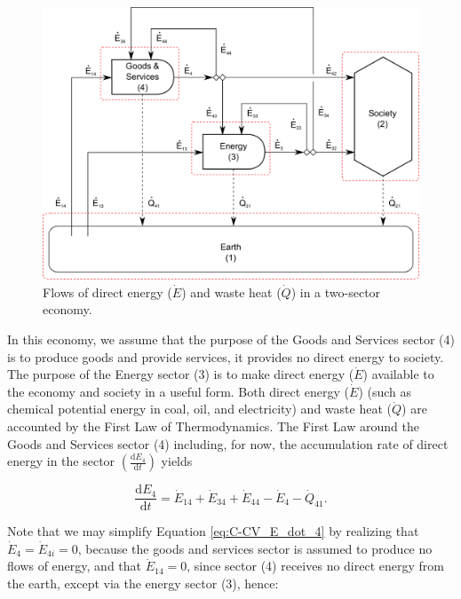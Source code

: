 \documentclass[authoryear,preprint,review,12pt]{elsarticle}
\begin{document}
\begin{figure}[h!]
\includegraphics[width=1.0\linewidth]{images/I-O_three_sector_direct_energy.pdf}
\caption{Flows of direct energy ($\dot{E}$) and waste heat ($\dot{Q}$) in a two-sector economy.}
\label{fig:direct_energy_flows_2}
\end{figure}

In this economy, we assume that the purpose of the Goods and Services sector (4) is to produce goods and provide services, it provides no direct energy to society. The purpose of the Energy sector (3) is to make direct energy ($\dot{E}$) available to the economy and society in a useful form. Both direct energy ($\dot{E}$) (such as chemical potential energy in coal, oil, and electricity) and waste heat ($\dot{Q}$) are accounted by the First Law of Thermodynamics. The First Law around the Goods and Services sector (4) including, for now, the accumulation rate of direct energy in the sector $\left(\frac{\mathrm{d}E_{4}}{\mathrm{d}t}\right)$ yields

\begin{equation} \label{eq:C-CV_E_dot_4}
	\frac{\mathrm{d}E_{4}}{\mathrm{d}t} 	 =  \dot{E}_{14} + \dot{E}_{34} + \dot{E}_{44} - \dot{E}_4 - \dot{Q}_{41}.
\end{equation}

Note that we may simplify Equation \ref{eq:C-CV_E_dot_4} by realizing that $\dot{E}_{4} = \dot{E}_{4i} = 0$, because the goods and services sector is assumed to produce no flows of energy, and that $\dot{E}_{14} = 0$, since sector (4) receives no direct energy from the earth, except via the energy sector (3), hence:
\end{document}
